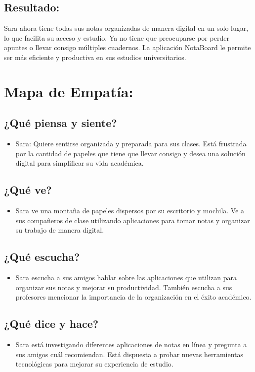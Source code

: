 \subsection*{Resultado:}
Sara ahora tiene todas sus notas organizadas de manera digital en un solo lugar, lo que facilita su acceso y estudio. Ya no tiene que preocuparse por perder apuntes o llevar consigo múltiples cuadernos. La aplicación NotaBoard le permite ser más eficiente y productiva en sus estudios universitarios.

\section*{Mapa de Empatía:}

\subsection*{¿Qué piensa y siente?}
\begin{itemize}
    \item Sara: Quiere sentirse organizada y preparada para sus clases. Está frustrada por la cantidad de papeles que tiene que llevar consigo y desea una solución digital para simplificar su vida académica.
\end{itemize}

\subsection*{¿Qué ve?}
\begin{itemize}
    \item Sara ve una montaña de papeles dispersos por su escritorio y mochila. Ve a sus compañeros de clase utilizando aplicaciones para tomar notas y organizar su trabajo de manera digital.
\end{itemize}

\subsection*{¿Qué escucha?}
\begin{itemize}
    \item Sara escucha a sus amigos hablar sobre las aplicaciones que utilizan para organizar sus notas y mejorar su productividad. También escucha a sus profesores mencionar la importancia de la organización en el éxito académico.
\end{itemize}

\subsection*{¿Qué dice y hace?}
\begin{itemize}
    \item Sara está investigando diferentes aplicaciones de notas en línea y pregunta a sus amigos cuál recomiendan. Está dispuesta a probar nuevas herramientas tecnológicas para mejorar su experiencia de estudio.
\end{itemize}


